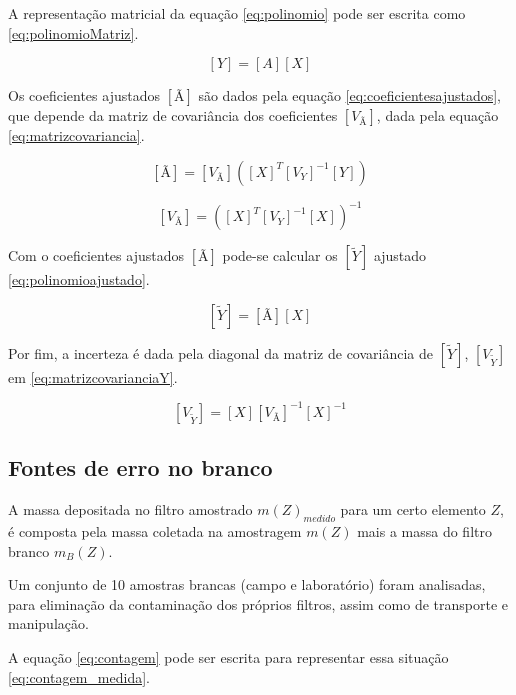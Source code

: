 A representação matricial da equação \ref{eq:polinomio} pode 
ser escrita como \ref{eq:polinomioMatriz}.

\begin{equation}
  \label{eq:polinomioMatriz}
  [Y] = [A][X]
\end{equation}

Os coeficientes ajustados $[Ã]$ são dados pela equação \ref{eq:coeficientesajustados},
que depende da matriz de covariância dos coeficientes $[V_{Ã}]$, 
dada pela equação \ref{eq:matrizcovariancia}.

\begin{equation}
  \label{eq:coeficientesajustados}
  [Ã] = [V_{Ã}] ([X]^T {[V_Y]}^{-1} [Y])
\end{equation}

\begin{equation}
  \label{eq:matrizcovariancia}
  [V_{Ã}] = ([X]^T [V_Y]^{-1} [X])^{-1}
\end{equation}

Com o coeficientes ajustados $[Ã]$ pode-se calcular os 
$[\tilde{Y}]$ ajustado \ref{eq:polinomioajustado}.

\begin{equation}
  \label{eq:polinomioajustado}
  [\tilde{Y}] = [Ã][X]
\end{equation}

Por fim, a incerteza é dada pela diagonal da matriz de covariância 
de $[\tilde{Y}]$, $[V_{\tilde{Y}}]$ em \ref{eq:matrizcovarianciaY}.

\begin{equation}
  \label{eq:matrizcovarianciaY}
  [V_{\tilde{Y}}] = [X] [V_{Ã}]^{-1} [X]^{-1}
\end{equation}

\subsection{Fontes de erro no branco}

A massa depositada no filtro amostrado $m(Z)_{medido}$ para um certo 
elemento $Z$, é composta pela massa coletada na amostragem $m(Z)$ 
mais a massa do filtro branco $m_{B}(Z)$. 

Um conjunto de 10 amostras brancas (campo e laboratório) foram analisadas, 
para eliminação da contaminação dos próprios filtros, assim como de 
transporte e manipulação.

A equação \ref{eq:contagem} pode ser escrita para representar essa situação
\ref{eq:contagem_medida}. 

